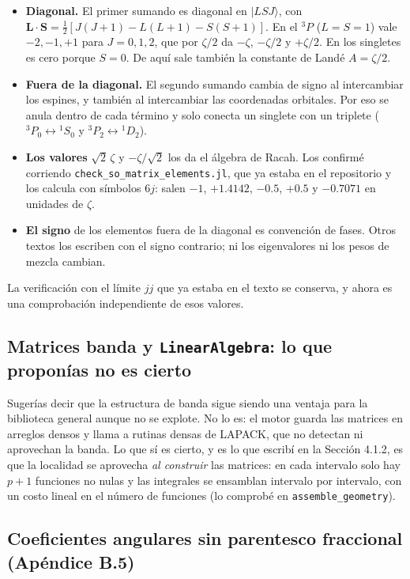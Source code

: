 \documentclass[11pt,a4paper]{article}
\newcommand{\arch}[1]{\texttt{\small #1}}
\begin{document}
\begin{itemize}
\item \textbf{Diagonal.} El primer sumando es diagonal en $|LSJ\rangle$, con
$\mathbf L\cdot\mathbf S=\tfrac12[J(J+1)-L(L+1)-S(S+1)]$. En el $^3P$ ($L=S=1$) vale $-2,-1,+1$
para $J=0,1,2$, que por $\zeta/2$ da $-\zeta$, $-\zeta/2$ y $+\zeta/2$. En los singletes es cero
porque $S=0$. De aquí sale también la constante de Landé $A=\zeta/2$.
\item \textbf{Fuera de la diagonal.} El segundo sumando cambia de signo al intercambiar los
espines, y también al intercambiar las coordenadas orbitales. Por eso se anula dentro de cada
término y solo conecta un singlete con un triplete ($^3P_0\leftrightarrow{}^1S_0$ y
$^3P_2\leftrightarrow{}^1D_2$).
\item \textbf{Los valores} $\sqrt2\,\zeta$ y $-\zeta/\sqrt2$ los da el álgebra de Racah. Los
confirmé corriendo \arch{check\_so\_matrix\_elements.jl}, que ya estaba en el repositorio y los
calcula con símbolos $6j$: salen $-1$, $+1.4142$, $-0.5$, $+0.5$ y $-0.7071$ en unidades de $\zeta$.
\item \textbf{El signo} de los elementos fuera de la diagonal es convención de fases. Otros textos
los escriben con el signo contrario; ni los eigenvalores ni los pesos de mezcla cambian.
\end{itemize}

La verificación con el límite $jj$ que ya estaba en el texto se conserva, y ahora es una
comprobación independiente de esos valores.

\subsection{Matrices banda y \texttt{LinearAlgebra}: lo que proponías no es cierto}

Sugerías decir que la estructura de banda sigue siendo una ventaja para la biblioteca general
aunque no se explote. No lo es: el motor guarda las matrices en arreglos densos y llama a rutinas
densas de LAPACK, que no detectan ni aprovechan la banda. Lo que sí es cierto, y es lo que escribí
en la Sección 4.1.2, es que la localidad se aprovecha \emph{al construir} las matrices: en cada
intervalo solo hay $p+1$ funciones no nulas y las integrales se ensamblan intervalo por intervalo,
con un costo lineal en el número de funciones (lo comprobé en \arch{assemble\_geometry}).

\subsection{Coeficientes angulares sin parentesco fraccional (Apéndice B.5)}
\end{document}
